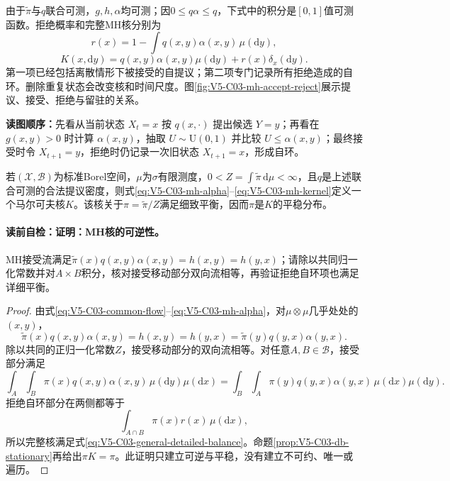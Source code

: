 由于$\widetilde\pi$与$q$联合可测，$g,h,\alpha$均可测；因$0\le q\alpha\le q$，下式中的积分是$[0,1]$值可测函数。拒绝概率和完整MH核分别为
\begin{equation}\label{eq:V5-C03-rejection-mass}
r(x)=1-\int q(x,y)\alpha(x,y)\,\mu(\mathrm dy),
\end{equation}
\begin{equation}\label{eq:V5-C03-mh-kernel}
K(x,\mathrm dy)
=q(x,y)\alpha(x,y)\mu(\mathrm dy)
+r(x)\delta_x(\mathrm dy).
\end{equation}
第一项已经包括离散情形下被接受的自提议；第二项专门记录所有拒绝造成的自环。删除重复状态会改变核和时间尺度。图\ref{fig:V5-C03-mh-accept-reject}展示提议、接受、拒绝与留驻的关系。

\FloatBarrier
\noindent\textbf{读图顺序：}先看从当前状态 $X_t=x$ 按 $q(x,\cdot)$ 提出候选 $Y=y$；再看在 $g(x,y)>0$ 时计算 $\alpha(x,y)$，抽取 $U\sim\mathrm U(0,1)$ 并比较 $U\le\alpha(x,y)$；最终接受时令 $X_{t+1}=y$，拒绝时仍记录一次旧状态 $X_{t+1}=x$，形成自环。

\begin{theorem}[MH核的可逆性]\label{thm:V5-C03-mh-reversible}
若$(\mathcal X,\mathcal B)$为标准Borel空间，$\mu$为$\sigma$有限测度，$0<Z=\int\widetilde\pi\,\mathrm d\mu<\infty$，且$q$是上述联合可测的合法提议密度，则式\eqref{eq:V5-C03-mh-alpha}--\eqref{eq:V5-C03-mh-kernel}定义一个马尔可夫核$K$。该核关于$\pi=\widetilde\pi/Z$满足细致平衡，因而$\pi$是$K$的平稳分布。
\end{theorem}
\paragraph{读前自检：证明：MH核的可逆性。}MH接受流满足$\widetilde\pi(x)q(x,y)\alpha(x,y)=h(x,y)=h(y,x)$；请除以共同归一化常数并对$A\times B$积分，核对接受移动部分双向流相等，再验证拒绝自环项也满足详细平衡。\par

\begin{proof}
由式\eqref{eq:V5-C03-common-flow}--\eqref{eq:V5-C03-mh-alpha}，对$\mu\otimes\mu$几乎处处的$(x,y)$，
\[
\widetilde\pi(x)q(x,y)\alpha(x,y)
=h(x,y)
=h(y,x)
=\widetilde\pi(y)q(y,x)\alpha(y,x).
\]
除以共同的正归一化常数$Z$，接受移动部分的双向流相等。对任意$A,B\in\mathcal B$，接受部分满足
\[
\int_A\!\int_B\pi(x)q(x,y)\alpha(x,y)
\,\mu(\mathrm dy)\mu(\mathrm dx)
=\int_B\!\int_A\pi(y)q(y,x)\alpha(y,x)
\,\mu(\mathrm dx)\mu(\mathrm dy).
\]
拒绝自环部分在两侧都等于
\[
\int_{A\cap B}\pi(x)r(x)\,\mu(\mathrm dx),
\]
所以完整核满足式\eqref{eq:V5-C03-general-detailed-balance}。命题\ref{prop:V5-C03-db-stationary}再给出$\pi K=\pi$。此证明只建立可逆与平稳，没有建立不可约、唯一或遍历。
\end{proof}

